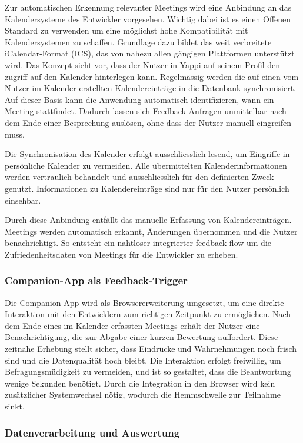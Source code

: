 \documentclass[12pt,a4paper]{report}
\begin{document}
Zur automatischen Erkennung relevanter Meetings wird eine Anbindung an das Kalendersysteme des Entwickler vorgesehen.
Wichtig dabei ist es einen Offenen Standard zu verwenden um eine möglichst hohe Kompatibilität mit Kalendersystemen zu schaffen.
Grundlage dazu bildet das weit verbreitete iCalendar-Format (ICS), das von nahezu allen gängigen Plattformen unterstützt wird.
Das Konzept sieht vor, dass der Nutzer in Yappi auf seinem Profil den zugriff auf den Kalender hinterlegen kann.
Regelmässig werden die auf einen vom Nutzer im Kalender erstellten Kalendereinträge in die Datenbank synchronisiert.
Auf dieser Basis kann die Anwendung automatisch identifizieren, wann ein Meeting stattfindet.
Dadurch lassen sich Feedback-Anfragen unmittelbar nach dem Ende einer Besprechung auslösen, ohne dass der Nutzer manuell eingreifen muss.

Die Synchronisation des Kalender erfolgt ausschliesslich lesend, um Eingriffe in persönliche Kalender zu vermeiden.
Alle übermittelten Kalenderinformationen werden vertraulich behandelt und ausschliesslich für den definierten Zweck genutzt.
Informationen zu Kalendereinträge sind nur für den Nutzer persönlich einsehbar.

Durch diese Anbindung entfällt das manuelle Erfassung von Kalendereinträgen. Meetings werden automatisch erkannt,
Änderungen übernommen und die Nutzer benachrichtigt. So entsteht ein nahtloser integrierter feedback flow um die
Zufriedenheitsdaten von Meetings für die Entwickler zu erheben.

\subsubsection{Companion-App als Feedback-Trigger}

Die Companion-App wird als Browsererweiterung umgesetzt, um eine direkte Interaktion mit den Entwicklern zum richtigen
Zeitpunkt zu ermöglichen. Nach dem Ende eines im Kalender erfassten Meetings erhält der Nutzer eine Benachrichtigung,
die zur Abgabe einer kurzen Bewertung auffordert. Diese zeitnahe Erhebung stellt sicher, dass Eindrücke und Wahrnehmungen
noch frisch sind und die Datenqualität hoch bleibt. Die Interaktion erfolgt freiwillig, um Befragungsmüdigkeit zu vermeiden,
und ist so gestaltet, dass die Beantwortung wenige Sekunden benötigt. Durch die Integration in den Browser wird kein
zusätzlicher Systemwechsel nötig, wodurch die Hemmschwelle zur Teilnahme sinkt.

\subsubsection{Datenverarbeitung und Auswertung}
\end{document}
